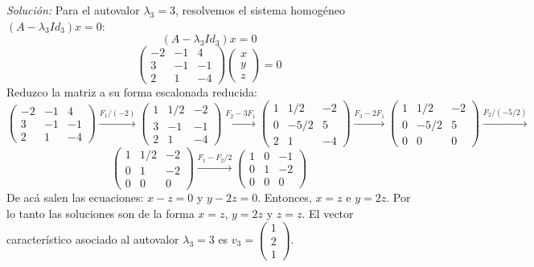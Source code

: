 \documentclass{article}
\newenvironment{solution}
    {\textit{Solución:}}
    {}
\begin{document}
\begin{solution}
    Para el autovalor $\lambda_3 = 3$, resolvemos el sistema homogéneo $(A - \lambda_3 Id_3)x = 0$:
    $$
    (A - \lambda_3 Id_3)x = 0
    $$
    $$
    \begin{pmatrix}
    -2 & -1 & 4 \\
    3 & -1 & -1 \\
    2 & 1 & -4
    \end{pmatrix}
    \begin{pmatrix}
    x \\
    y \\
    z
    \end{pmatrix}
    = 0
    $$
    Reduzco la matriz a su forma escalonada reducida:
    $$
    \begin{pmatrix}
        -2 & -1 & 4 \\
        3 & -1 & -1 \\
        2 & 1 & -4
    \end{pmatrix} \xrightarrow{F_1/(-2)}
    \begin{pmatrix}
        1 & 1/2 & -2 \\
        3 & -1 & -1 \\
        2 & 1 & -4
    \end{pmatrix} \xrightarrow{F_2-3F_1}
    \begin{pmatrix}
        1 & 1/2 & -2 \\
        0 & -5/2 & 5 \\
        2 & 1 & -4
    \end{pmatrix} \xrightarrow{F_3-2F_1}
    \begin{pmatrix}
        1 & 1/2 & -2 \\
        0 & -5/2 & 5 \\
        0 & 0 & 0
    \end{pmatrix} \xrightarrow{F_2/(-5/2)}
    $$
    $$
    \begin{pmatrix}
        1 & 1/2 & -2 \\
        0 & 1 & -2 \\
        0 & 0 & 0
    \end{pmatrix} \xrightarrow{F_1-F_2/2}
    \begin{pmatrix}
        1 & 0 & -1 \\
        0 & 1 & -2 \\
        0 & 0 & 0
    \end{pmatrix}
    $$
    De acá salen las ecuaciones: $x-z = 0$ y $y-2z = 0$. Entonces, $x=z$ e $y=2z$. Por lo tanto las soluciones son
    de la forma $x = z$, $y = 2z$ y $z = z$. El vector característico asociado al autovalor $\lambda_3 = 3$ es $v_3 = \begin{pmatrix} 1 \\ 2 \\ 1 \end{pmatrix}$.
\end{solution}
\end{document}
